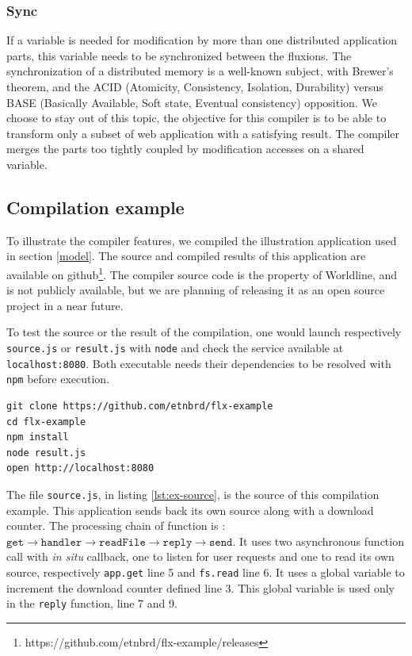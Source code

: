 \subsubsection{Sync}

If a variable is needed for modification by more than one distributed application parts, this variable needs to be synchronized between the fluxions.
The synchronization of a distributed memory is a well-known subject, with Brewer's theorem\cite{Gilbert2002}\cite{codahale2010}, and the ACID (Atomicity, Consistency, Isolation, Durability) versus BASE (Basically Available, Soft state, Eventual consistency) opposition\cite{Fox1997}.
We choose to stay out of this topic, the objective for this compiler is to be able to transform only a subset of web application with a satisfying result.
The compiler merges the parts too tightly coupled by modification accesses on a shared variable.

\subsection{Compilation example}

To illustrate the compiler features, we compiled the illustration application used in section \ref{model}.
The source and compiled results of this application are available on github\cite{flx-example}\footnote{\raggedright https://github.com/etnbrd/flx-example/releases}.
The compiler source code is the property of Worldline, and is not publicly available, but we are planning of releasing it as an open source project in a near future.

To test the source or the result of the compilation, one would launch respectively \texttt{source.js} or \texttt{result.js} with \texttt{node} and check the service available at \texttt{localhost:8080}.
Both executable needs their dependencies to be resolved with \texttt{npm} before execution.
\begin{verbatim}
git clone https://github.com/etnbrd/flx-example
cd flx-example
npm install
node result.js
open http://localhost:8080
\end{verbatim}

The file \texttt{source.js}, in listing \ref{lst:ex-source}, is the source of this compilation example.
This application sends back its own source along with a download counter.
The processing chain of function is : $\texttt{get} \to \texttt{handler} \to \texttt{readFile} \to \texttt{reply} \to \texttt{send}$.
It uses two asynchronous function call with \textit{in situ} callback, one to listen for user requests and one to read its own source, respectively \texttt{app.get} line 5 and \texttt{fs.read} line 6.
It uses a global variable to increment the download counter defined line 3.
This global variable is used only in the \texttt{reply} function, line 7 and 9.

